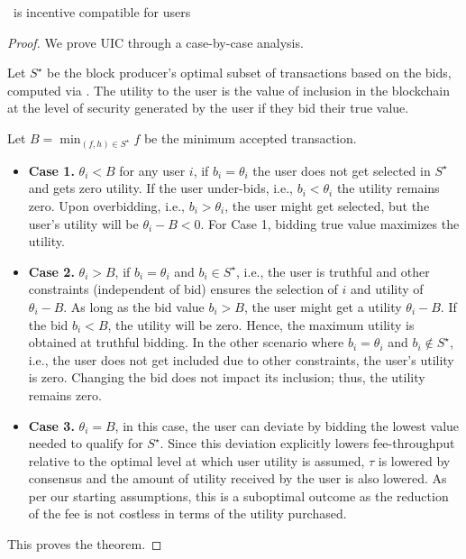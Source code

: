\begin{theorem}\label{thm:UIC}
   \ourTFM\ is incentive compatible for users
\end{theorem}
\begin{proof}

    We prove UIC through a case-by-case analysis.

    Let $S^\star$ be the block producer's optimal subset of transactions based on the bids, computed via \ourOPT. The utility to the user is the value of inclusion in the blockchain at the level of security generated by the user if they bid their true value.

    Let $B = \min_{(f, h)\in S^\star} f$ be the minimum accepted transaction.

    \begin{itemize}[leftmargin=*]

        \item \textbf{Case 1.} $\theta_i < B$ for any user $i$, if $b_i = \theta_i$ the user does not get selected in $S^\star$ and gets zero utility. If the user under-bids, i.e., $b_i < \theta_i$ the utility remains zero. Upon overbidding, i.e., $b_i > \theta_i$, the user might get selected, but the user's utility will be $\theta_i - B < 0$. For Case 1, bidding true value maximizes the utility.

        \item \textbf{Case 2.} $\theta_i > B$, if $b_i = \theta_i$ and $b_i \in S^\star$, i.e., the user is truthful and other constraints (independent of bid) ensures the selection of $i$ and utility of $\theta_i - B$. As long as the bid value $b_i > B$, the user might get a utility $\theta_i - B$. If the bid $b_i < B$, the utility will be zero. Hence, the maximum utility is obtained at truthful bidding. In the other scenario where $b_i = \theta_i$ and $b_i \not\in S^\star$, i.e., the user does not get included due to other constraints, the user's utility is zero. Changing the bid does not impact its inclusion; thus, the utility remains zero.

        \item \textbf{Case 3.} $\theta_i = B$, in this case, the user can deviate by bidding the lowest value needed to qualify for $S^\star$. Since this deviation explicitly lowers fee-throughput relative to the optimal level at which user utility is assumed, $\tau$ is lowered by consensus and the amount of utility received by the user is also lowered. As per our starting assumptions, this is a suboptimal outcome as the reduction of the fee is not costless in terms of the utility purchased.
    \end{itemize}
    This proves the theorem.
\end{proof}

